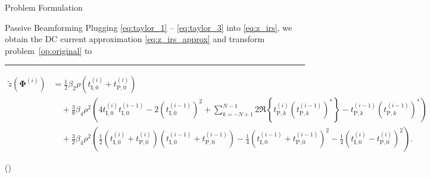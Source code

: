 \documentclass[journal]{IEEEtran}
\begin{document}
\begin{section}{Problem Formulation}
\begin{subsection}{Passive Beamforming}
			Plugging \eqref{eq:taylor_1} -- \eqref{eq:taylor_3} into \eqref{eq:z_irs}, we obtain the DC current approximation \eqref{eq:z_irs_approx} and transform problem~\eqref{op:original} to
			\begin{figure*}[!b]
				\hrule
				\begin{align}
					\tilde{z}(\boldsymbol{\Phi}^{(i)})
					& = \frac{1}{2}{\beta_2}{\rho}(t_{\mathrm{I},0}^{(i)}+t_{\mathrm{P},0}^{(i)})\nonumber\\
					& \quad + \frac{3}{8}{\beta_4}{\rho^2} \left(4 t_{\mathrm{I},0}^{(i)}t_{\mathrm{I},0}^{(i-1)} - 2 (t_{\mathrm{I},0}^{(i-1)})^2 + \sum_{k=-N+1}^{N-1}{2 \Re\left\{t_{\mathrm{P},k}^{(i)} (t_{\mathrm{P},k}^{(i-1)})^*\right\} - t_{\mathrm{P},k}^{(i-1)} (t_{\mathrm{P},k}^{(i-1)})^*}\right)\nonumber\\
					& \quad + \frac{3}{2}{\beta_4}{\rho^2} \left(\frac{1}{2}(t_{\mathrm{I},0}^{(i)} + t_{\mathrm{P},0}^{(i)})(t_{\mathrm{I},0}^{(i-1)} + t_{\mathrm{P},0}^{(i-1)}) - \frac{1}{4}(t_{\mathrm{I},0}^{(i-1)} + t_{\mathrm{P},0}^{(i-1)})^2 - \frac{1}{4}(t_{\mathrm{I},0}^{(i)} - t_{\mathrm{P},0}^{(i)})^2\right).\label{eq:z_irs_approx}
				\end{align}
			\end{figure*}
			\begin{maxi!}
				{\boldsymbol{\Phi}}{(\boldsymbol{\Phi})}{\label{op:irs}}{\label{ob:irs}}
				\label{co:irs_rate}
				\label{co:irs_modulus}
				\label{co:irs_sd}
			\end{maxi!}


\end{subsection}
\end{section}
\end{document}
